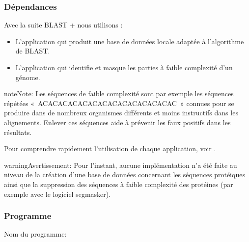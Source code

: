 \documentclass[letterpaper,10pt,french]{sphinxmanual}
\begin{document}
\subsubsection{Dépendances}
\label{\detokenize{tutorial:id31}}
Avec la suite BLAST + nous utilisons :
\begin{itemize}
\item {} 
L’application  qui produit une base de données locale adaptée à l’algorithme de BLAST.

\item {} 
L’application  qui identifie et masque les parties à faible complexité d’un génome.

\end{itemize}

\begin{sphinxadmonition}{note}{Note:}
Les séquences de faible complexité sont par exemple les séquences répétées « ACACACACACACACACACACACACACAC » connues pour se produire dans de nombreux organismes différents et moins instructifs dans les alignements. Enlever ces séquences aide à prévenir les faux positifs dans les résultats.
\end{sphinxadmonition}




Pour comprendre rapidement l’utilisation de chaque application, voir  .



\begin{sphinxadmonition}{warning}{Avertissement:}
Pour l’instant, aucune implémentation n’a été faite au niveau de la création d’une base de données concernant les séquences protéiques ainsi que la suppression des séquences à faible complexité des protéines (par exemple avec le logiciel segmasker).
\end{sphinxadmonition}


\subsubsection{Programme}
\label{\detokenize{tutorial:id32}}
Nom du programme:

\begin{sphinxVerbatim}[commandchars=\\\{\}]
\end{sphinxVerbatim}
\end{document}
